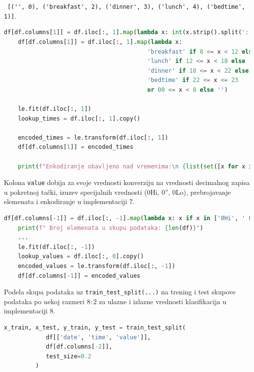 \documentclass[fontsize=12bp, paper=a4]{scrarticle}
\begin{document}
\verb| [('', 0), ('breakfast', 2), ('dinner', 3), ('lunch', 4), ('bedtime', 1)]|.

\begin{lstlisting}[language=Python, caption={\centering Svođenje vrednosti vremena na kategoričke vrednosti i enkodiranje vrednosti}]
    df[df.columns[1]] = df.iloc[:, 1].map(lambda x: int(x.strip().split(':')[0]))
    df[df.columns[1]] = df.iloc[:, 1].map(lambda x: 
                                         'breakfast' if 8 <= x < 12 else
                                         'lunch' if 12 <= x < 18 else			 
                                         'dinner' if 18 <= x < 22 else
                                         'bedtime' if 22 <= x <= 23 
                                         or 00 <= x < 8 else '')
    
    le.fit(df.iloc[:, 1])
    lookup_times = df.iloc[:, 1].copy()
    
    encoded_times = le.transform(df.iloc[:, 1])
    df[df.columns[1]] = encoded_times
    
    print(f"Enkodiranje obavljeno nad vremenima:\n {list(set([x for x in zip(lookup_times,encoded_times)]))}")
\end{lstlisting}

Kolona \texttt{value} dobija za svoje vrednosti konverziju na vrednosti decimalnog zapisa u pokretnoj tački, izuzev specijalnih vrednosti (0Hi, 0'', 0Lo), prebrojavanje elemenata i enkodiranje u implementaciji 7. 
\begin{lstlisting}[language=Python, caption={\centering Kolona \texttt{value} dobija za svoje vrednosti konverziju na vrednosti decimalnog zapisa u pokretnoj tački, izuzev specijalnih vrednosti, prebrojavanje elemenata i enkodiranje}]
    df[df.columns[-1]] = df.iloc[:, -1].map(lambda x: x if x in ['0Hi', ' 0Hi', ' 0\'\'', ' 0Lo'] else str(float(x)))
    print(f" Broj elemenata u skupu podataka: {len(df)}")
    ...
    le.fit(df.iloc[:, -1])
    lookup_values = df.iloc[:, 0].copy()
    encoded_values = le.transform(df.iloc[:, -1])
    df[df.columns[-1]] = encoded_values
\end{lstlisting}
   
Podela skupa podataka uz \verb|train_test_split(...)| na trening i test skupove podataka po nekoj razmeri $8:2$ za ulazne i izlazne vrednosti klasifikacija u implementaciji 8.

\begin{lstlisting}[language=Python, caption={\centering Podela na trening i test skupove podataka}]
    x_train, x_test, y_train, y_test = train_test_split(
            df[['date', 'time', 'value']],
            df[df.columns[-2]],
            test_size=0.2
         )
\end{lstlisting}
\end{document}
